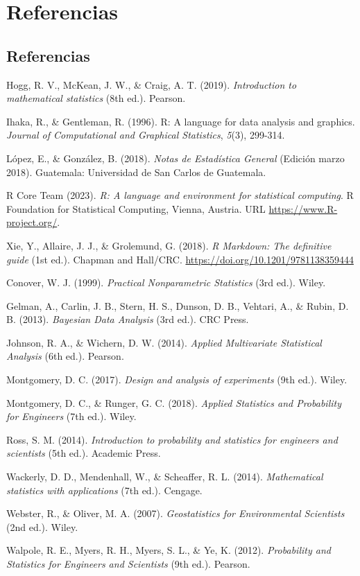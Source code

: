 \documentclass[
  spanish,
  letterpaper,
]{book}
\begin{document}
\part{Referencias}


\chapter*{Referencias}\label{referencias-1}


Hogg, R. V., McKean, J. W., \& Craig, A. T. (2019). \emph{Introduction
to mathematical statistics} (8th ed.). Pearson.

Ihaka, R., \& Gentleman, R. (1996). R: A language for data analysis and
graphics. \emph{Journal of Computational and Graphical Statistics},
\emph{5}(3), 299-314.

López, E., \& González, B. (2018). \emph{Notas de Estadística General}
(Edición marzo 2018). Guatemala: Universidad de San Carlos de Guatemala.

R Core Team (2023). \emph{R: A language and environment for statistical
computing}. R Foundation for Statistical Computing, Vienna, Austria. URL
\href{https://www.r-project.org/}{https://www.R-project.org/}.

Xie, Y., Allaire, J. J., \& Grolemund, G. (2018). \emph{R Markdown: The
definitive guide} (1st ed.). Chapman and Hall/CRC.
\url{https://doi.org/10.1201/9781138359444}

Conover, W. J. (1999). \emph{Practical Nonparametric Statistics} (3rd
ed.). Wiley.

Gelman, A., Carlin, J. B., Stern, H. S., Dunson, D. B., Vehtari, A., \&
Rubin, D. B. (2013). \emph{Bayesian Data Analysis} (3rd ed.). CRC Press.

Johnson, R. A., \& Wichern, D. W. (2014). \emph{Applied Multivariate
Statistical Analysis} (6th ed.). Pearson.

Montgomery, D. C. (2017). \emph{Design and analysis of experiments} (9th
ed.). Wiley.

Montgomery, D. C., \& Runger, G. C. (2018). \emph{Applied Statistics and
Probability for Engineers} (7th ed.). Wiley.

Ross, S. M. (2014). \emph{Introduction to probability and statistics for
engineers and scientists} (5th ed.). Academic Press.

Wackerly, D. D., Mendenhall, W., \& Scheaffer, R. L. (2014).
\emph{Mathematical statistics with applications} (7th ed.). Cengage.

Webster, R., \& Oliver, M. A. (2007). \emph{Geostatistics for
Environmental Scientists} (2nd ed.). Wiley.

Walpole, R. E., Myers, R. H., Myers, S. L., \& Ye, K. (2012).
\emph{Probability and Statistics for Engineers and Scientists} (9th
ed.). Pearson.


\backmatter
\printbibliography
\end{document}
